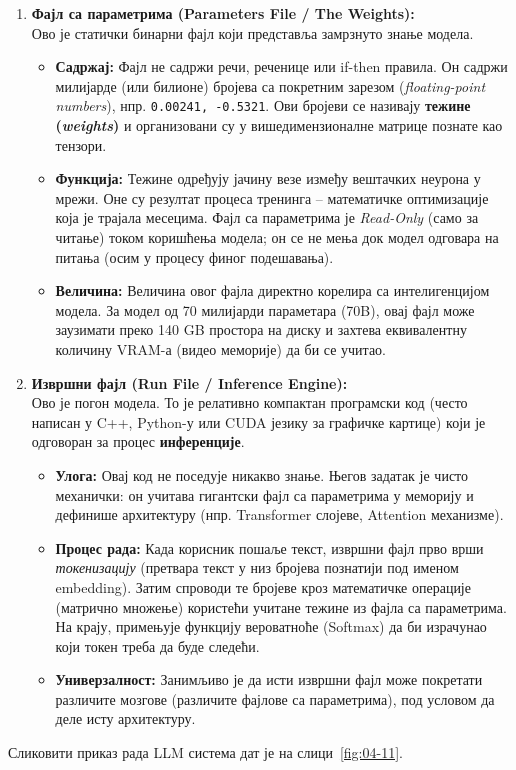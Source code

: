 \begin{enumerate}
    \item \textbf{Фајл са параметрима (Parameters File / The Weights):} \\
    Ово је статички бинарни фајл који представља замрзнуто знање модела.
    \begin{itemize}
        \item \textbf{Садржај:} Фајл не садржи речи, реченице или if-then правила. Он садржи милијарде (или билионе) бројева са покретним зарезом (\textit{floating-point numbers}), нпр. \texttt{0.00241, -0.5321}. Ови бројеви се називају \textbf{тежине (\textit{weights})} и организовани су у вишедимензионалне матрице познате као тензори.
        \item \textbf{Функција:} Тежине одређују јачину везе између вештачких неурона у мрежи. Оне су резултат процеса тренинга – математичке оптимизације која је трајала месецима. Фајл са параметрима је \textit{Read-Only} (само за читање) током коришћења модела; он се не мења док модел одговара на питања (осим у процесу финог подешавања).
        \item \textbf{Величина:} Величина овог фајла директно корелира са интелигенцијом модела. За модел од 70 милијарди параметара (70B), овај фајл може заузимати преко 140 GB простора на диску и захтева еквивалентну количину VRAM-а (видео меморије) да би се учитао.
    \end{itemize}

    \item \textbf{Извршни фајл (Run File / Inference Engine):} \\
    Ово је погон модела. То је релативно компактан програмски код (често написан у C++, Python-у или CUDA језику за графичке картице) који је одговоран за процес \textbf{инференције}.
    \begin{itemize}
        \item \textbf{Улога:} Овај код не поседује никакво знање. Његов задатак је чисто механички: он учитава гигантски фајл са параметрима у меморију и дефинише архитектуру (нпр. Transformer слојеве, Attention механизме).
        \item \textbf{Процес рада:} Када корисник пошаље текст, извршни фајл прво врши \textit{токенизацију} (претвара текст у низ бројева познатији под именом embedding). Затим спроводи те бројеве кроз математичке операције (матрично множење) користећи учитане тежине из фајла са параметрима. На крају, примењује функцију вероватноће (Softmax) да би израчунао који токен треба да буде следећи.
        \item \textbf{Универзалност:} Занимљиво је да исти извршни фајл може покретати различите мозгове (различите фајлове са параметрима), под условом да деле исту архитектуру.
    \end{itemize}
\end{enumerate}
\noindent
Сликовити приказ рада LLM система дат је на слици~\ref{fig:04-11}.


